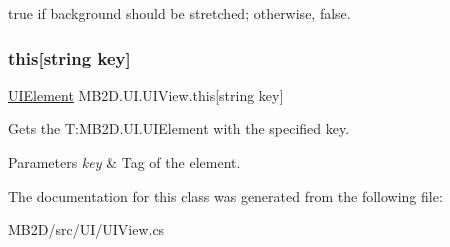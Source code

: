 {\ttfamily true} if background should be stretched; otherwise, {\ttfamily false}.\hypertarget{class_m_b2_d_1_1_u_i_1_1_u_i_view_aa054a491e5acf3816240b671db3212ce}{}\label{class_m_b2_d_1_1_u_i_1_1_u_i_view_aa054a491e5acf3816240b671db3212ce} 
\subsubsection{\texorpdfstring{this[string key]}{this[string key]}}
{\footnotesize\ttfamily \hyperlink{class_m_b2_d_1_1_u_i_1_1_u_i_element}{U\+I\+Element} M\+B2\+D.\+U\+I.\+U\+I\+View.\+this\mbox{[}string key\mbox{]}\hspace{0.3cm}{\ttfamily [get]}}



Gets the T\+:\+M\+B2\+D.\+U\+I.\+U\+I\+Element with the specified key. 


\begin{DoxyParams}{Parameters}
{\em key} & Tag of the element.\\
\hline
\end{DoxyParams}


The documentation for this class was generated from the following file\+:\begin{DoxyCompactItemize}
\item 
M\+B2\+D/src/\+U\+I/U\+I\+View.\+cs\end{DoxyCompactItemize}
